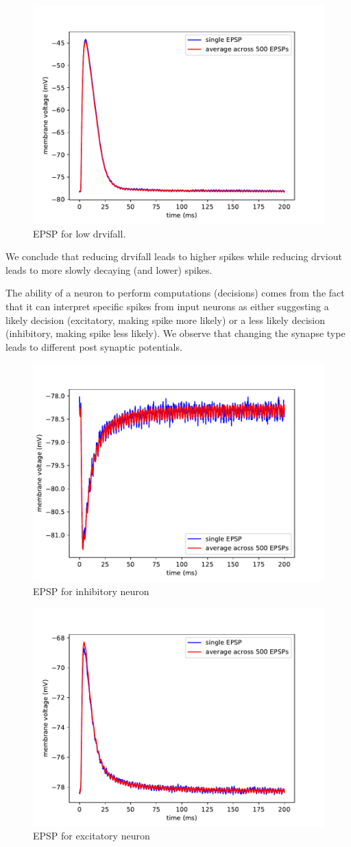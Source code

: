 \documentclass[a4paper,twocolumn]{article}
\begin{document}
\begin{figure}[ht]
    \centering
    \includegraphics[width=.5\textwidth]{figures/epsp_fall_-.pdf}
    \caption{EPSP for low drvifall.}
    \label{fig:epsp_fall-}
\end{figure}
We conclude that reducing drvifall leads to higher spikes while reducing drviout
leads to more slowly decaying (and lower) spikes.  \par 
The ability of a neuron to perform computations (decisions) comes from the fact
that it can interpret specific spikes from input neurons as either suggesting
a likely decision (excitatory,  making spike more likely) or  a less likely decision
(inhibitory, making spike less likely).  We observe that changing the synapse type
leads to different post synaptic potentials.
\begin{figure}[ht]
    \centering
    \includegraphics[width=.5\textwidth]{figures/epsp_inh_fall_03_out_05.pdf}
    \caption{EPSP for inhibitory neuron}
    \label{fig:epsp_inh_fall}
\end{figure}
\begin{figure}[ht]
    \centering
    \includegraphics[width=.5\textwidth]{figures/epsp_exc_fall_03_out_05.pdf}
    \caption{EPSP for excitatory neuron}
    \label{fig:epsp_exc_fall}
\end{figure}
\end{document}
